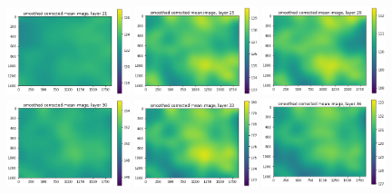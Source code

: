 \documentclass[letterpaper,11pt]{article}
\begin{document}
\begin{figure}[!ht]
\centering
\includegraphics[width=0.32\textwidth]{images/results/smoothed_corrected_mean_image_layers_polaris/smoothed_corrected_mean_image_layer_21_same_scale}
\includegraphics[width=0.32\textwidth]{images/results/smoothed_corrected_mean_image_layers_polaris/smoothed_corrected_mean_image_layer_25_same_scale}
\includegraphics[width=0.32\textwidth]{images/results/smoothed_corrected_mean_image_layers_polaris/smoothed_corrected_mean_image_layer_29_same_scale}
\includegraphics[width=0.32\textwidth]{images/results/smoothed_corrected_mean_image_layers_polaris/smoothed_corrected_mean_image_layer_30_same_scale}
\includegraphics[width=0.32\textwidth]{images/results/smoothed_corrected_mean_image_layers_polaris/smoothed_corrected_mean_image_layer_33_same_scale}
\includegraphics[width=0.32\textwidth]{images/results/smoothed_corrected_mean_image_layers_polaris/smoothed_corrected_mean_image_layer_36_same_scale}

\end{figure}
\end{document}
